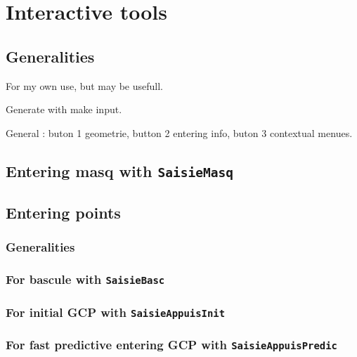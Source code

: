 \chapter{Interactive tools}

\section{Generalities}

For my own use, but may be usefull.

Generate with make input.

General :  buton 1 geometrie, button 2  entering info, buton 3 contextual
menues.

\section{Entering masq with {\tt SaisieMasq}}



\section{Entering points}

\subsection{Generalities}

\subsection{For bascule with {\tt SaisieBasc}}

\label{SaisieBasc}
\subsection{For initial GCP  with {\tt SaisieAppuisInit}}

\subsection{For  fast predictive entering GCP with {\tt SaisieAppuisPredic}}

